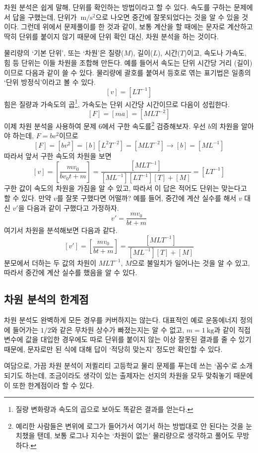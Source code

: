 \documentclass{scrartcl}
\newcommand{\un}[1]{\ensuremath{\ \mathrm{#1}}}
\begin{document}
차원 분석은 쉽게 말해, 단위를 확인하는 방법이라고 할 수 있다. 속도를 구하는 문제에서 답을 구했는데, 단위가 \un{m/s^2}으로 나오면 중간에 잘못되었다는 것을 알 수 있을 것이다. 그런데 위에서 문제풀이를 한 것과 같이, 보통 계산을 할 때에는 문자로 계산하고 딱히 단위를 붙이지 않기 때문에 단위 확인 대신, 차원 분석을 하는 것이다.

물리량의 `기본 단위', 또는 `차원'은 질량(\(M\)), 길이(\(L\)), 시간(\(T\))이고, 속도나 가속도, 힘 등 단위는 이들 차원을 조합해 만든다. 예를 들어서 속도는 단위 시간당 거리 (길이)이므로 다음과 같이 쓸 수 있다. 물리량에 괄호를 붙여서 등호로 엮는 표기법은 일종의 `단위 방정식'이라고 볼 수 있다.
\[[v]=[LT^{-1}]\]
힘은 질량과 가속도의 곱\footnote{질량 변화량과 속도의 곱으로 보아도 똑같은 결과를 얻는다.}, 가속도는 단위 시간당 시간이므로 다음이 성립한다.
\[[F]=[ma]=[MLT^{-2}]\]
이제 차원 분석을 사용하여 문제 6에서 구한 속도를\footnote{예리한 사람들은 변위에 로그가 들어가서 여기서 하는 방법대로 안 된다는 것을 눈치챘을 탠데, 보통 로그나 지수는 `차원이 없는' 물리량으로 생각하고 풀어도 무방하다.} 검증해보자. 우선 \(b\)의 차원을 알아야 하는데, \(F=bv^2\)이므로
\[[F]=[bv^2]=[b][L^2T^{-2}]=[MLT^{-2}]\longrightarrow[b]=[ML^{-1}]\]
따라서 앞서 구한 속도의 차원을 보면
\[[v]=\left[\frac{mv_0}{bv_0t+m}\right]=\frac{[MLT^{-1}]}{[ML^{-1}][LT^{-1}][T]+[M]}=[LT^{-1}]\]
구한 값이 속도의 차원을 가짐을 알 수 있고, 따라서 이 답은 적어도 단위는 맞는다고 할 수 있다. 만약 \(v\)를 잘못 구했다면 어떨까? 예를 들어, 중간에 계산 실수를 해서 \(v\) 대신 \(v'\)을 다음과 같이 구했다고 가정하자.
\[v'=\frac{mv_0}{bt+m}\]
여기서 차원을 분석해보면 다음과 같다.
\[[v']=\left[\frac{mv_0}{bt+m}\right]=\frac{[MLT^{-1}]}{[ML^{-1}][T]+[M]}\]
분모에서 더하는 두 값의 차원이 \(MLT^{-1}\), \(M\)으로 불일치가 일어나는 것을 알 수 있고, 따라서 중간에 계산 실수를 했음을 알 수 있다.

\subsection{차원 분석의 한계점}
차원 분석도 완벽하게 모든 경우를 커버하지는 않는다. 대표적인 예로 운동에너지 정의에 들어가는 \(1/2\)와 같은 무차원 상수가 빠졌는지는 알 수 없고, \(m=1\un{kg}\)과 같이 직접 변수에 값을 대입한 경우에도 따로 단위를 붙이지 않는 이상 잘못된 결과를 줄 수 있기 때문에, 문자로만 된 식에 대해 답이 `적당히 맞는지' 정도만 확인할 수 있다.

여담으로, 가끔 차원 분석이 저퀼리티 고등학교 물리 문제를 푸는데 쓰는 `꼼수'로 소개되기도 하는데, 조금이라도 생각이 있는 출제자는 선지의 차원을 모두 맞춰놓기 때문에 이 또한 한계점이라 할 수 있다.
\end{document}
